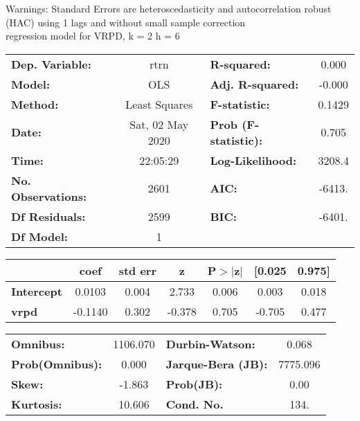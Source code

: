 Warnings: \newline
 [1] Standard Errors are heteroscedasticity and autocorrelation robust (HAC) using 1 lags and without small sample correction\\ 

regression model for VRPD, k = 2 h = 6\begin{center}
\begin{tabular}{lclc}
\toprule
\textbf{Dep. Variable:}    &       rtrn       & \textbf{  R-squared:         } &     0.000   \\
\textbf{Model:}            &       OLS        & \textbf{  Adj. R-squared:    } &    -0.000   \\
\textbf{Method:}           &  Least Squares   & \textbf{  F-statistic:       } &    0.1429   \\
\textbf{Date:}             & Sat, 02 May 2020 & \textbf{  Prob (F-statistic):} &    0.705    \\
\textbf{Time:}             &     22:05:29     & \textbf{  Log-Likelihood:    } &    3208.4   \\
\textbf{No. Observations:} &        2601      & \textbf{  AIC:               } &    -6413.   \\
\textbf{Df Residuals:}     &        2599      & \textbf{  BIC:               } &    -6401.   \\
\textbf{Df Model:}         &           1      & \textbf{                     } &             \\
\bottomrule
\end{tabular}
\begin{tabular}{lcccccc}
                   & \textbf{coef} & \textbf{std err} & \textbf{z} & \textbf{P$> |$z$|$} & \textbf{[0.025} & \textbf{0.975]}  \\
\midrule
\textbf{Intercept} &       0.0103  &        0.004     &     2.733  &         0.006        &        0.003    &        0.018     \\
\textbf{vrpd}      &      -0.1140  &        0.302     &    -0.378  &         0.705        &       -0.705    &        0.477     \\
\bottomrule
\end{tabular}
\begin{tabular}{lclc}
\textbf{Omnibus:}       & 1106.070 & \textbf{  Durbin-Watson:     } &    0.068  \\
\textbf{Prob(Omnibus):} &   0.000  & \textbf{  Jarque-Bera (JB):  } & 7775.096  \\
\textbf{Skew:}          &  -1.863  & \textbf{  Prob(JB):          } &     0.00  \\
\textbf{Kurtosis:}      &  10.606  & \textbf{  Cond. No.          } &     134.  \\
\bottomrule
\end{tabular}
\end{center}

